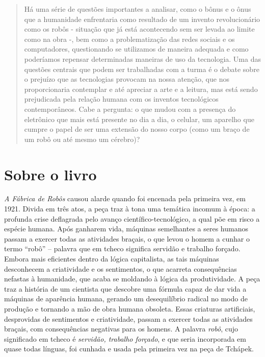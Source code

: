 \documentclass[11pt]{extarticle}
\begin{document}
\begin{abstract}
Há uma série de questões importantes a analisar, como o bônus e o ônus que a humanidade enfrentaria como resultado de um invento revolucionário como os robôs - situação que já está acontecendo sem ser levada ao limite como na obra -, bem como a problematização das redes sociais e os computadores, questionando se utilizamos de maneira adequada e como poderíamos repensar determinadas maneiras de uso da tecnologia. Uma das questões centrais que podem ser trabalhadas com a turma é o debate sobre o prejuízo que as tecnologias provocam na nossa atenção, que nos proporcionaria contemplar e até apreciar a arte e a leitura, mas está sendo prejudicada pela relação humana com os inventos tecnológicos contemporâneos. Cabe a pergunta: o que mudou com a presença do eletrônico que mais está presente no dia a dia, o celular, um aparelho que cumpre o papel de ser uma extensão do nosso corpo (como um braço de um robô ou até mesmo um cérebro)? 

\end{abstract}

\section{Sobre o livro}

\textit{A Fábrica de Robôs} causou alarde quando foi encenada pela primeira vez, em 1921. Divida em três atos, a peça traz à tona uma temática incomum à época: a profunda crise deflagrada pelo avanço científico-tecnológico, a qual põe em risco a espécie humana. Após ganharem vida, máquinas semelhantes a seres humanos passam a exercer todas as atividades braçais, o que levou o homem a cunhar o termo “robô” – palavra que em tcheco significa servidão e trabalho forçado. Embora mais eficientes dentro da lógica capitalista, as tais máquinas desconhecem a criatividade e os sentimentos, o que acarreta consequências nefastas à humanidade, que acaba se moldando à lógica da produtividade. A peça traz a história de um cientista que descobre uma fórmula capaz de dar vida a máquinas de aparência humana, gerando um desequilíbrio radical no modo de produção e tornando a mão de obra humana obsoleta. Essas criaturas artificiais, desprovidas de sentimentos e criatividade, passam a exercer todas as atividades braçais, com consequências negativas para os homens. A palavra \textit{robô}, cujo significado em tcheco é \textit{servidão, trabalho forçado}, e que seria incorporada em quase todas línguas, foi cunhada e usada pela primeira vez na peça de Tchápek.
\end{document}
